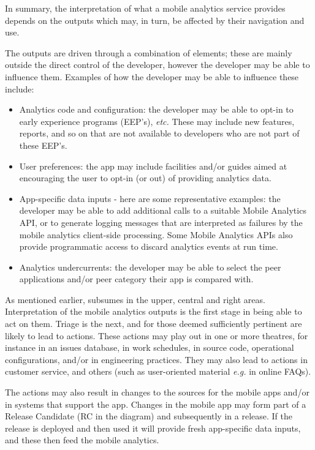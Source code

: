 In summary, the interpretation of what a mobile analytics service provides depends on the outputs which may, in turn, be affected by their navigation and use. 

The outputs are driven through a combination of elements; these are mainly outside the direct control of the developer, however the developer may be able to influence them. Examples of how the developer may be able to influence these include:
\begin{itemize}
    \itemsep0em
    \item Analytics code and configuration: the developer may be able to opt-in to early experience programs (EEP's), \emph{etc.} These may include new features, reports, and so on that are not available to developers who are not part of these EEP's.
    \item User preferences: the app may include facilities and/or guides aimed at encouraging the user to opt-in (or out) of providing analytics data.
    \item App-specific data inputs - here are some representative examples: the developer may be able to add additional calls to a suitable Mobile Analytics API, or to generate logging messages that are interpreted as failures by the mobile analytics client-side processing. Some Mobile Analytics APIs also provide programmatic access to discard analytics events at run time.  
    \item Analytics undercurrents: the developer may be able to select the peer applications and/or peer category their app is compared with.
\end{itemize}

As mentioned earlier,  subsumes  in the upper, central and right areas. Interpretation of the mobile analytics outputs is the first stage in being able to act on them. Triage is the next, and for those deemed sufficiently pertinent are likely to lead to actions. These actions may play out in one or more theatres, for instance in an issues database, in work schedules, in source code, operational configurations, and/or in engineering practices. They may also lead to actions in customer service, and others (such as user-oriented material \emph{e.g.} in online FAQs).

The actions may also result in changes to the sources for the mobile apps and/or in systems that support the app. Changes in the mobile app may form part of a Release Candidate (RC in the diagram) and subsequently in a release. If the release is deployed and then used it will provide fresh app-specific data inputs, and these then feed the mobile analytics.

